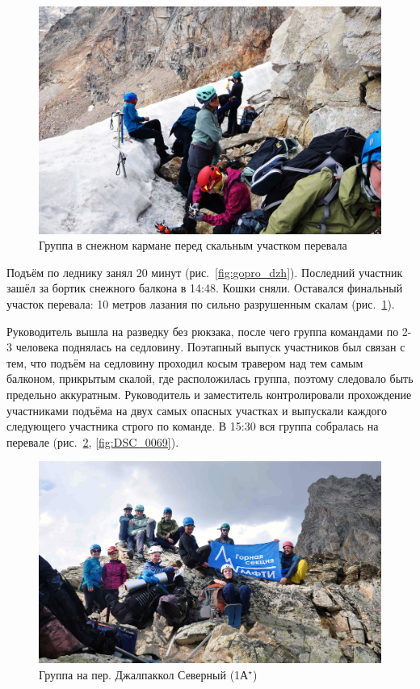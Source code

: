 \begin{figure}[h!]	
	\centering
	\includegraphics[angle=0, width=0.7\linewidth]{../pics/DSC_0021}
	\caption{Группа в снежном кармане перед скальным участком перевала}
	\label{fig:DSC_0021}
\end{figure}

Подъём по леднику занял 20 минут (рис.~\ref{fig:gopro_dzh}). Последний участник зашёл за бортик снежного балкона в 14:48. Кошки сняли. Оставался финальный участок перевала: 10 метров лазания по сильно разрушенным скалам (рис.~\ref{fig:DSC_0021}).

Руководитель вышла на разведку без рюкзака, после чего группа командами по 2-3 человека поднялась на седловину. Поэтапный выпуск участников был связан с тем, что подъём на седловину проходил косым травером над тем самым балконом, прикрытым скалой, где расположилась группа, поэтому следовало быть предельно аккуратным. Руководитель и заместитель контролировали прохождение участниками подъёма на двух самых опасных участках и выпускали каждого следующего участника строго по команде. В 15:30 вся группа собралась на перевале (рис.~\ref{fig:DSC_0063}, \ref{fig:DSC_0069}).

\begin{figure}[h!]	
	\centering
	\includegraphics[angle=0, width=0.7\linewidth]{../pics/DSC_0063}
	\caption{Группа на пер. Джалпаккол Северный (1А$^\star$)}
	\label{fig:DSC_0063}
\end{figure}

